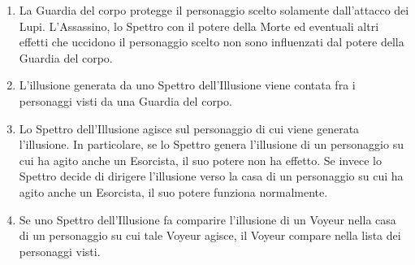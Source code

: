 \documentclass[a4paper,10pt]{article}
\begin{document}
\begin{enumerate}
	\item La Guardia del corpo protegge il personaggio scelto solamente dall'attacco dei Lupi. L'Assassino, lo Spettro con il potere della Morte ed eventuali altri effetti che uccidono il personaggio scelto non sono influenzati dal potere della Guardia del corpo.
	
	\item L'illusione generata da uno Spettro dell'Illusione viene contata fra i personaggi visti da una Guardia del corpo.
	
	\item Lo Spettro dell'Illusione agisce sul personaggio di cui viene generata l'illusione. In particolare, se lo Spettro genera l'illusione di un personaggio su cui ha agito anche un Esorcista, il suo potere non ha effetto. Se invece lo Spettro decide di dirigere l'illusione verso la casa di un personaggio su cui ha agito anche un Esorcista, il suo potere funziona normalmente.
	
	\item Se uno Spettro dell'Illusione fa comparire l'illusione di un Voyeur nella casa di un personaggio su cui tale Voyeur agisce, il Voyeur compare nella lista dei personaggi visti.
	
%	
	
	

\end{enumerate}
\end{document}
